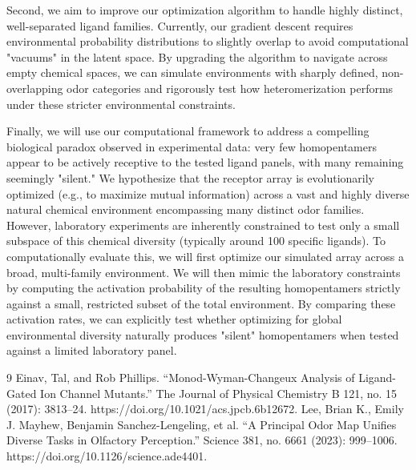 \documentclass[
    reprint, %
    amsmath,
    amssymb,
    aps,
    prb,      %
    floatfix
]{revtex4-2}
\begin{document}
Second, we aim to improve our optimization algorithm to handle highly distinct, well-separated ligand families. Currently, our gradient descent requires environmental probability distributions to slightly overlap to avoid computational "vacuums" in the latent space. By upgrading the algorithm to navigate across empty chemical spaces, we can simulate environments with sharply defined, non-overlapping odor categories and rigorously test how heteromerization performs under these stricter environmental constraints.

Finally, we will use our computational framework to address a compelling biological paradox observed in experimental data: very few homopentamers appear to be actively receptive to the tested ligand panels, with many remaining seemingly "silent." We hypothesize that the receptor array is evolutionarily optimized (e.g., to maximize mutual information) across a vast and highly diverse natural chemical environment encompassing many distinct odor families. However, laboratory experiments are inherently constrained to test only a small subspace of this chemical diversity (typically around 100 specific ligands). To computationally evaluate this, we will first optimize our simulated array across a broad, multi-family environment. We will then mimic the laboratory constraints by computing the activation probability of the resulting homopentamers strictly against a small, restricted subset of the total environment. By comparing these activation rates, we can explicitly test whether optimizing for global environmental diversity naturally produces "silent" homopentamers when tested against a limited laboratory panel.

\begin{thebibliography}{9}
    Einav, Tal, and Rob Phillips. “Monod-Wyman-Changeux Analysis of Ligand-Gated Ion Channel Mutants.” The Journal of Physical Chemistry B 121, no. 15 (2017): 3813–24. https://doi.org/10.1021/acs.jpcb.6b12672.
    Lee, Brian K., Emily J. Mayhew, Benjamin Sanchez-Lengeling, et al. “A Principal Odor Map Unifies Diverse Tasks in Olfactory Perception.” Science 381, no. 6661 (2023): 999–1006. https://doi.org/10.1126/science.ade4401.
    \label{LastBibItem}
\end{thebibliography}
\end{document}
